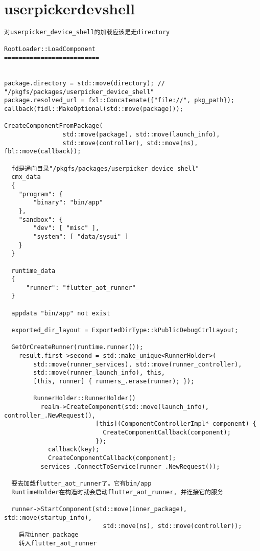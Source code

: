 \section{userpickerdevshell}


\begin{verbatim}
对userpicker_device_shell的加载应该是走directory

RootLoader::LoadComponent
==========================


package.directory = std::move(directory); // "/pkgfs/packages/userpicker_device_shell"
package.resolved_url = fxl::Concatenate({"file://", pkg_path});
callback(fidl::MakeOptional(std::move(package)));

CreateComponentFromPackage(
                std::move(package), std::move(launch_info),
                std::move(controller), std::move(ns), fbl::move(callback));

  fd是通向目录"/pkgfs/packages/userpicker_device_shell"
  cmx_data 
  {
    "program": {
        "binary": "bin/app"
    },
    "sandbox": {
        "dev": [ "misc" ],
        "system": [ "data/sysui" ]
    }
  }

  runtime_data
  {
      "runner": "flutter_aot_runner"
  }

  appdata "bin/app" not exist

  exported_dir_layout = ExportedDirType::kPublicDebugCtrlLayout;

  GetOrCreateRunner(runtime.runner());
    result.first->second = std::make_unique<RunnerHolder>(
        std::move(runner_services), std::move(runner_controller),
        std::move(runner_launch_info), this,
        [this, runner] { runners_.erase(runner); });

        RunnerHolder::RunnerHolder()
          realm->CreateComponent(std::move(launch_info), controller_.NewRequest(),
                         [this](ComponentControllerImpl* component) {
                           CreateComponentCallback(component);
                         });
            callback(key);
            CreateComponentCallback(component);
          services_.ConnectToService(runner_.NewRequest());

  要去加载flutter_aot_runner了。它有bin/app
  RuntimeHolder在构造时就会启动flutter_aot_runner, 并连接它的服务

  runner->StartComponent(std::move(inner_package), std::move(startup_info),
                           std::move(ns), std::move(controller));
    启动inner_package
    转入flutter_aot_runner
\end{verbatim}